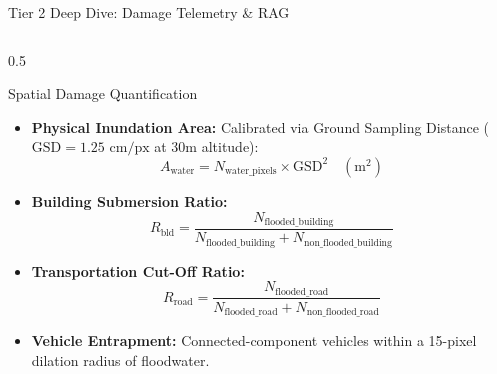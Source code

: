 \documentclass[aspectratio=169, 10pt, professionalfonts]{beamer}
\begin{document}
\begin{frame}{Tier 2 Deep Dive: Damage Telemetry \& RAG}
  \begin{columns}[T]
    \begin{column}{0.5\textwidth}
      \begin{block}{Spatial Damage Quantification}
        \begin{itemize}\setlength{\itemsep}{0.4em}\footnotesize
          \item \textbf{Physical Inundation Area:} Calibrated via Ground Sampling Distance ($\text{GSD} = 1.25\text{ cm/px}$ at 30m altitude):
            $$A_{\text{water}} = N_{\text{water\_pixels}} \times \text{GSD}^2 \quad (\text{m}^2)$$
          \item \textbf{Building Submersion Ratio:}
            $$R_{\text{bld}} = \frac{N_{\text{flooded\_building}}}{N_{\text{flooded\_building}} + N_{\text{non\_flooded\_building}}}$$
          \item \textbf{Transportation Cut-Off Ratio:}
            $$R_{\text{road}} = \frac{N_{\text{flooded\_road}}}{N_{\text{flooded\_road}} + N_{\text{non\_flooded\_road}}}$$
          \item \textbf{Vehicle Entrapment:} Connected-component vehicles within a 15-pixel dilation radius of floodwater.
        \end{itemize}
      \end{block}
    \end{column}
    

\end{columns}
\end{frame}
\end{document}

